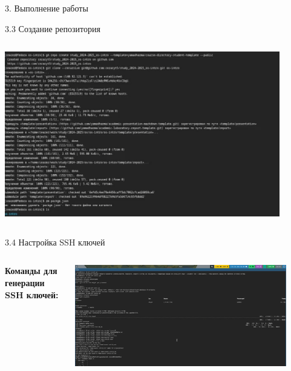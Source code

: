 \documentclass[
  ignorenonframetext,
  aspectratio=169,
]{beamer}
\newenvironment{Shaded}{\begin{snugshade}}{\end{snugshade}}
\newcommand{\AttributeTok}[1]{\textcolor[rgb]{0.40,0.45,0.13}{#1}}
\newcommand{\BuiltInTok}[1]{\textcolor[rgb]{0.00,0.23,0.31}{#1}}
\newcommand{\FunctionTok}[1]{\textcolor[rgb]{0.28,0.35,0.67}{#1}}
\newcommand{\NormalTok}[1]{\textcolor[rgb]{0.00,0.23,0.31}{#1}}
\newcommand{\StringTok}[1]{\textcolor[rgb]{0.13,0.47,0.30}{#1}}
\newcommand{\VariableTok}[1]{\textcolor[rgb]{0.07,0.07,0.07}{#1}}
\begin{document}
\begin{frame}[fragile]{3. Выполнение работы}
\begin{block}{3.3 Создание репозитория}
\begin{columns}[c]
\begin{column}{0.4\textwidth}
\includegraphics[width=0.9\textwidth,height=\textheight]{./image/repo.png}
\end{column}
\end{columns}
\end{block}

\begin{block}{3.4 Настройка SSH ключей}
\label{ux43dux430ux441ux442ux440ux43eux439ux43aux430-ssh-ux43aux43bux44eux447ux435ux439}
\begin{columns}[c]
\begin{column}{0.6\textwidth}
\textbf{Команды для генерации SSH ключей:}

\begin{Shaded}
\end{Shaded}
\end{column}

\begin{column}{0.4\textwidth}
\includegraphics[width=0.9\textwidth,height=\textheight]{./image/ssh.png}
\end{column}
\end{columns}
\end{block}


\end{frame}
\end{document}
